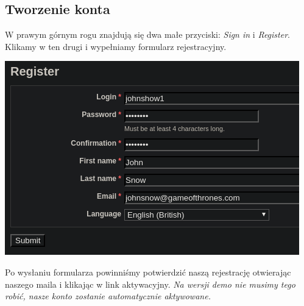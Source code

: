 \documentclass{article}
\begin{document}
\subsection{Tworzenie konta}
W prawym górnym rogu znajdują się dwa małe przyciski: \textit{Sign in} i \textit{Register}.
Klikamy w ten drugi i wypełniamy formularz rejestracyjny.
\begin{center}
    \includegraphics[scale=0.6]{register.png}
\end{center}
Po wysłaniu formularza powinniśmy potwierdzić naszą rejestrację
otwierając naszego maila i klikając w link aktywacyjny. \textit{
    Na wersji demo nie musimy tego robić, nasze konto zostanie
    automatycznie aktywowane.
}
\end{document}
